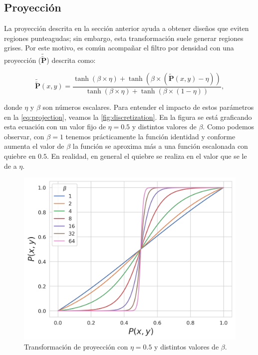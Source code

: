 \subsection{Proyección}

La proyección descrita en la sección anterior ayuda a obtener diseños que eviten regiones punteagudas;
sin embargo, esta transformación suele generar regiones grises.
Por este motivo, es común acompañar el filtro por densidad con una proyección 
($\widetilde{\widetilde{\boldsymbol{P}}}$) descrita como:

\begin{equation}
  \widetilde{\widetilde{\boldsymbol{P}}}(x, y) = \frac{\tanh (\beta \times \eta) + \tanh (\beta \times
  (\widetilde{\boldsymbol{P}}(x, y)
  - \eta))}{\tanh (\beta \times \eta) + \tanh (\beta \times (1 - \eta))},
  \label{eq:projection}
\end{equation}

\noindent donde $\eta$ y $\beta$ son números escalares. Para entender el impacto de estos parámetros
en la \autoref{eq:projection}, veamos la \autoref{fig:discretization}.
En la figura se está graficando esta ecuación con un valor fijo de $\eta = 0.5$ y distintos valores de
$\beta$.
Como podemos observar, con $\beta = 1$ tenemos prácticamente la función identidad y conforme aumenta
el valor de $\beta$ la función se aproxima más a una función escalonada con quiebre en $0.5$. 
En realidad, en general el quiebre se realiza en el valor que se le de a $\eta$.

    \begin{figure}[ht]
      \centering
      \includegraphics[scale=0.75]{image/theory/discretization.png}
      \caption{Transformación de proyección con $\eta = 0.5$ y distintos valores
      de $\beta$.}
      \label{fig:discretization}
    \end{figure}

